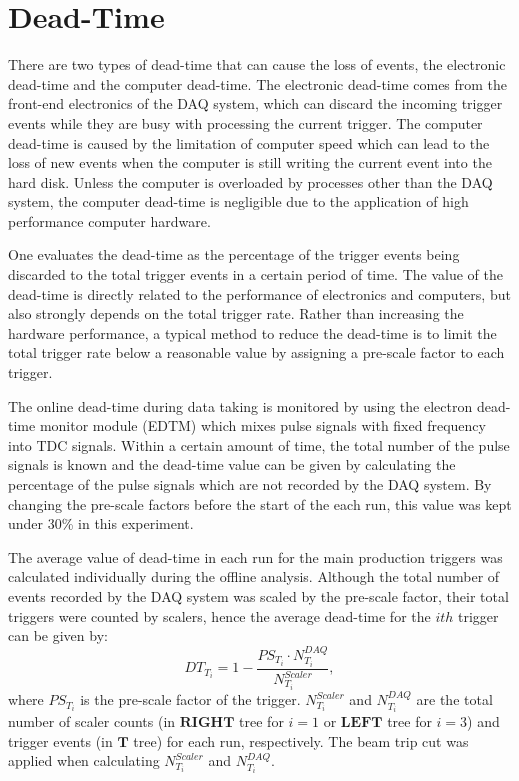 \section{Dead-Time}
  There are two types of dead-time that can cause the loss of events, the electronic dead-time and the computer dead-time. The electronic dead-time comes from the front-end electronics of the DAQ system, which can discard the incoming trigger events while they are busy with processing the current trigger. The computer dead-time is caused by the limitation of computer speed which can lead to the loss of new events when the computer is still writing the current event into the hard disk. Unless the computer is overloaded by processes other than the DAQ system, the computer dead-time is negligible due to the application of high performance computer hardware. 
 
 One evaluates the dead-time as the percentage of the trigger events being discarded to the total trigger events in a certain period of time. The value of the dead-time is directly related to the performance of electronics and computers, but also strongly depends on the total trigger rate. Rather than increasing the hardware performance, a typical method to reduce the dead-time is to limit the total trigger rate below a reasonable value by assigning a pre-scale factor to each trigger. 
 
 The online dead-time during data taking is monitored by using the electron dead-time monitor module (EDTM) which mixes pulse signals with fixed frequency into TDC signals. Within a certain amount of time, the total number of the pulse signals is known and the dead-time value can be given by calculating the percentage of the pulse signals which are not recorded by the DAQ system. By changing the pre-scale factors before the start of the each run, this value was kept under 30\% in this experiment.
 
 The average value of dead-time in each run for the main production triggers was calculated individually during the offline analysis. Although the total number of events recorded by the DAQ system was scaled by the pre-scale factor, their total triggers were counted by scalers, hence the average dead-time for the $ith$ trigger can be given by:
\begin{equation}
  DT_{T_{i}} = 1 - \frac{PS_{T_{i}}\cdot N_{T_{i}}^{DAQ} }{N_{T_{i}}^{Scaler}},
  \label{eq_dt}
\end{equation}
where $PS_{T_{i}}$ is the pre-scale factor of the trigger. $N_{T_{i}}^{Scaler}$ and $N_{T_{i}}^{DAQ}$ are the total number of scaler counts (in $\mathbf{RIGHT}$ tree for $i=1$ or $\mathbf{LEFT}$ tree for $i=3$) and trigger events (in $\mathbf{T}$ tree) for each run, respectively. The beam trip cut was applied when calculating $N_{T_{i}}^{Scaler}$ and $N_{T_{i}}^{DAQ}$.

